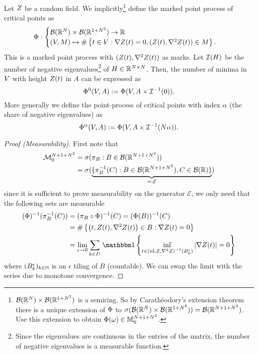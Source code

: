 \begin{definition}
	Let \(\rf\) be a random field. We implicitly\footnote{
		\(\borel(\real^\dimension)\times\borel(\real^{1+\dimension^2})\) is a semiring. So by
		Carathéodory's extension theorem there is a unique extension of
		\(\crit\) to
		\(\sigma(\borel(\real^\dimension)\times\borel(\real^{1+\dimension^2}))=\borel(\real^{\dimension+1+\dimension^2})\).
		Use this extension to obtain \(\crit(\omega)\in\locFiniteMeasure[\dimension+1+\dimension^2]\).
	} define the marked point process of critical points as
	\begin{align*}
		\crit:
		\begin{cases}
			\borel(\real^\dimension)\times\borel(\real^{1+\dimension^2}) \to \real\\
			(\Vol, M) \mapsto
			\#\left\{t\in\Vol:
				\nabla\rf(t)=0,
				(\rf(t), \nabla^2 \rf(t))\in M
			\right\}.
		\end{cases}
	\end{align*}
	This is a marked point process with \((\rf(t), \nabla^2\rf(t))\) as marks.
	Let \(\negEV(H)\) be the number of negative eigenvalues\footnote{
		Since the eigenvalues are continuous in the entries of the matrix, the
		number of negative eigenvalues is a measurable function.
	} of \(H\in\real^{\dimension\times\dimension}\). Then, the number of minima in
	\(\Vol\) with height \(\rf(t)\) in \(A\) can be expressed as
	\[
		\crit^0(\Vol, A):= \crit(\Vol, A\times\negEV^{-1}(0)).
	\]
	More generally we define the point-process of critical points with index
	\(\alpha\) (the share of negative eigenvalues) as
	\[
		\crit^\alpha(\Vol, A)
		:= \crit(\Vol, A\times\negEV^{-1}(\dimension\alpha)).
	\]
\end{definition}
\begin{proof}[Proof (Measurability)]
	First note that	
	\begin{align*}
		\locFiniteMeasAlg[\dimension+1+\dimension^2]
		&= \sigma(\pi_B : B\in\borel(\real^{\dimension+1+\dimension^2}))\\
		&=\sigma(\underbrace{
			\{\pi_B^{-1}(C) : B\in\borel(\real^{\dimension+1+\dimension^2}), C\in\borel(\real)\}
		}_{=:\mathcal{E}}
		)
	\end{align*}
	since it is sufficient to prove measurability on the generator
	\(\mathcal{E}\), we only need that the following sets are measurable
	\begin{align*}
		(\crit)^{-1}(\pi^{-1}_{B}(C))
		&= (\pi_{B} \circ \crit)^{-1}(C)
		= (\crit(B))^{-1}(C)\\
		&= \#\left\{\left(t,\rf(t),\nabla^2\rf(t)\right) \in B:
			\nabla\rf(t)=0
		\right\}\\
		&= \lim_{\epsilon\to 0} \sum_{k\in I^\epsilon}
		\ind\left\{
			\inf_{t\in \left(\text{id}, \rf, \nabla^2\rf\right)^{-1}(B^\epsilon_k) }
		|\nabla \rf(t)| = 0
		\right\}
	\end{align*}
	where \((B^\epsilon_k)_{k\in\nat}\) is an \(\epsilon\) tiling of \(B\) (countable).
	We can swap the limit with the series due to monotone convergence.
\end{proof}

